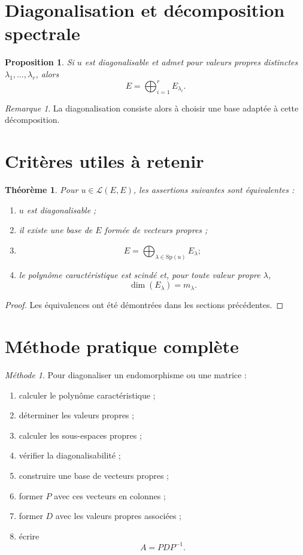 \documentclass[11pt,a4paper]{article}
\newtheorem{theoreme}[definition]{Théorème}
\newtheorem{proposition}[definition]{Proposition}
\theoremstyle{remark}
\newtheorem{remarque}[definition]{Remarque}
\newtheorem*{methode}{Méthode}
\newcommand{\Sp}{\mathrm{Sp}}
\begin{document}
\section{Diagonalisation et décomposition spectrale}

\begin{proposition}
Si \(u\) est diagonalisable et admet pour valeurs propres distinctes \(\lambda_1,\dots,\lambda_r\), alors
\[
E=\bigoplus_{i=1}^r E_{\lambda_i}.
\]
\end{proposition}

\begin{remarque}
La diagonalisation consiste alors à choisir une base adaptée à cette décomposition.
\end{remarque}

\section{Critères utiles à retenir}

\begin{theoreme}
Pour \(u\in\mathcal L(E,E)\), les assertions suivantes sont équivalentes :
\begin{enumerate}[label=\arabic*)]
    \item \(u\) est diagonalisable ;
    \item il existe une base de \(E\) formée de vecteurs propres ;
    \item
    \[
    E=\bigoplus_{\lambda\in\Sp(u)}E_\lambda ;
    \]
    \item le polynôme caractéristique est scindé et, pour toute valeur propre \(\lambda\),
    \[
    \dim(E_\lambda)=m_\lambda.
    \]
\end{enumerate}
\end{theoreme}

\begin{proof}
Les équivalences ont été démontrées dans les sections précédentes.
\end{proof}

\section{Méthode pratique complète}

\begin{methode}
Pour diagonaliser un endomorphisme ou une matrice :
\begin{enumerate}[label=\arabic*)]
    \item calculer le polynôme caractéristique ;
    \item déterminer les valeurs propres ;
    \item calculer les sous-espaces propres ;
    \item vérifier la diagonalisabilité ;
    \item construire une base de vecteurs propres ;
    \item former \(P\) avec ces vecteurs en colonnes ;
    \item former \(D\) avec les valeurs propres associées ;
    \item écrire
    \[
    A=PDP^{-1}.
    \]
\end{enumerate}
\end{methode}
\end{document}
